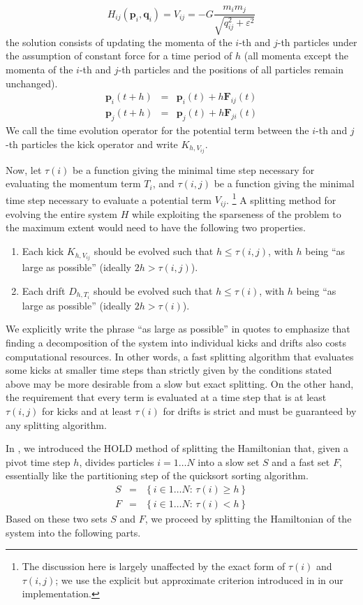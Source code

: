 \documentclass[referee]{aa}
\begin{document}
\[
H_{ij}(\mathbf{p}_{i},\mathbf{q}_{i})=V_{ij}=-G\frac{m_{i}m_{j}}{\sqrt{q_{ij}^{2}+\varepsilon^{2}}}
\]
the solution consists of updating the momenta of the $i$-th and $j$-th
particles under the assumption of constant force for a time period
of $h$ (all momenta except the momenta of the $i$-th and $j$-th
particles and the positions of all particles remain unchanged). 
\begin{eqnarray*}
\mathbf{p}_{i}(t+h) & = & \mathbf{p}_{i}(t)+h\mathbf{F}_{ij}(t)\\
\mathbf{p}_{j}(t+h) & = & \mathbf{p}_{j}(t)+h\mathbf{F}_{ji}(t)
\end{eqnarray*}
 We call the time evolution operator for the potential term between
the $i$-th and $j$-th particles the kick operator and write $K_{h,V_{ij}}$.

Now, let $\tau(i)$ be a function giving the minimal time step necessary
for evaluating the momentum term $T_{i}$, and $\tau(i,j)$ be a function
giving the minimal time step necessary to evaluate a potential term
$V_{ij}$.%
\footnote{The discussion here is largely unaffected by the exact form of $\tau(i)$
and $\tau(i,j)$; we use the explicit but approximate criterion introduced
in \cite{Pelupessy:2012if} in our implementation.%
} A splitting method for evolving the entire system $H$ while exploiting
the sparseness of the problem to the maximum extent would need to
have the following two properties.
\begin{enumerate}
\item Each kick $K_{h,V_{ij}}$ should be evolved such that $h\leq\tau(i,j)$,
with $h$ being ``as large as possible'' (ideally $2h>\tau(i,j)$).
\item Each drift $D_{h,T_{i}}$ should be evolved such that $h\leq\tau(i)$,
with $h$ being ``as large as possible'' (ideally $2h>\tau(i)$).
\end{enumerate}
We explicitly write the phrase ``as large as possible'' in quotes
to emphasize that finding a decomposition of the system into individual
kicks and drifts also costs computational resources. In other words,
a fast splitting algorithm that evaluates some kicks at smaller time
steps than strictly given by the conditions stated above may be more
desirable from a slow but exact splitting. On the other hand, the
requirement that every term is evaluated at a time step that is at
least $\tau(i,j)$ for kicks and at least $\tau(i)$ for drifts is
strict and must be guaranteed by any splitting algorithm.

In \cite{Pelupessy:2012if}, we introduced the HOLD method of splitting
the Hamiltonian that, given a pivot time step $h$, divides particles
$i=1\ldots N$ into a slow set $S$ and a fast set $F$, essentially
like the partitioning step of the quicksort sorting algorithm.
\begin{eqnarray*}
S & = & \left\{ i\in1\ldots N:\,\tau(i)\geq h\right\} \\
F & = & \left\{ i\in1\ldots N:\,\tau(i)<h\right\} 
\end{eqnarray*}
Based on these two sets $S$ and $F$, we proceed by splitting the
Hamiltonian of the system into the following parts.
\end{document}
